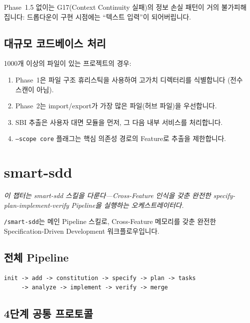\documentclass[11pt,a4paper,openright,twoside]{report}
\newcommand{\cmd}[1]{\texttt{/#1}}
\begin{document}
Phase~1.5 없이는 G17(Context Continuity 실패)의 정보 손실 패턴이 거의 불가피해집니다: 드롭다운이 구현 시점에는 ``텍스트 입력''이 되어버립니다.

\section{대규모 코드베이스 처리}

1000개 이상의 파일이 있는 프로젝트의 경우:

\begin{enumerate}
  \item Phase~1은 파일 구조 휴리스틱을 사용하여 고가치 디렉터리를 식별합니다 (전수 스캔이 아님).
  \item Phase~2는 import/export가 가장 많은 파일(허브 파일)을 우선합니다.
  \item SBI 추출은 사용자 대면 모듈을 먼저, 그 다음 내부 서비스를 처리합니다.
  \item \texttt{--scope core} 플래그는 핵심 의존성 경로의 Feature로 추출을 제한합니다.
\end{enumerate}


\chapter{smart-sdd}
\label{ch:smart-sdd}

\textit{이 챕터는 smart-sdd 스킬을 다룬다---Cross-Feature 인식을 갖춘 완전한 specify-plan-implement-verify Pipeline을 실행하는 오케스트레이터다.}

\cmd{smart-sdd}는 메인 Pipeline 스킬로, Cross-Feature 메모리를 갖춘 완전한 Specification-Driven Development 워크플로우입니다.

\section{전체 Pipeline}

\begin{lstlisting}[title={Pipeline Steps}]
init -> add -> constitution -> specify -> plan -> tasks
     -> analyze -> implement -> verify -> merge
\end{lstlisting}

\section{4단계 공통 프로토콜}
\end{document}

